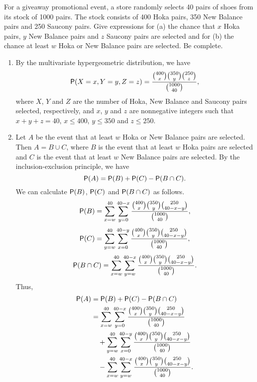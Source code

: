 \documentclass[12pt]{article}
\newcommand{\Prob}{{\sf P}}
\newenvironment{problem}[2][Problem]{\begin{trivlist}
\item[\hskip \labelsep {\bfseries #1}\hskip \labelsep {\bfseries #2.}]}
{\end{trivlist}}
\begin{document}
\begin{problem}{4}
  For a giveaway promotional event, a store randomly selects 40 
  pairs of shoes from its stock of 1000 pairs. The stock consists of 
  400 Hoka pairs, 350 New Balance pairs and 250 Saucony pairs. 
  Give expressions for (a) the chance that $x$ Hoka pairs, 
  $y$ New Balance pairs and $z$ Saucony pairs are selected and for 
  (b) the chance at least $w$ Hoka or New Balance pairs
  are selected. Be complete.

  \begin{enumerate}
    \item By the multivariate hypergeometric distribution, we have
    \[
      \Prob(X = x, Y = y, Z = z) = \frac{\binom{400}{x} \binom{350}{y} \binom{250}{z}}
      {\binom{1000}{40}},
    \]
    where $X$, $Y$ and $Z$ are the number of Hoka, New Balance and Saucony pairs
    selected, respectively, and $x$, $y$ and $z$ are nonnegative integers such that
    $x + y + z = 40$, $x \le 400$, $y \le 350$ and $z \le 250$.
    \item Let $A$ be the event that at least $w$ Hoka or New Balance pairs
    are selected. Then $A = B \cup C$, where $B$ is the event that at least $w$ Hoka pairs
    are selected and $C$ is the event that at least $w$ New Balance pairs are selected.
    By the inclusion-exclusion principle, we have
    \[
      \Prob(A) = \Prob(B) + \Prob(C) - \Prob(B \cap C).
    \]
    We can calculate $\Prob(B)$, $\Prob(C)$ and $\Prob(B \cap C)$ as follows.
    \[
      \Prob(B) = \sum_{x=w}^{40} \sum_{y=0}^{40-x} 
      \frac{\binom{400}{x} \binom{350}{y} \binom{250}{40-x-y}}{\binom{1000}{40}},
    \]
    \[
      \Prob(C) = \sum_{y=w}^{40} \sum_{x=0}^{40-y} 
      \frac{\binom{400}{x} \binom{350}{y} \binom{250}{40-x-y}}{\binom{1000}{40}},
    \]
    \[
      \Prob(B \cap C) = \sum_{x=w}^{40} \sum_{y=w}^{40-x} 
      \frac{\binom{400}{x} \binom{350}{y} \binom{250}{40-x-y}}{\binom{1000}{40}}.
    \]
    Thus,
    \[
      \begin{aligned}
        \Prob(A) &= \Prob(B) + \Prob(C) - \Prob(B \cap C) \\
        &= \sum_{x=w}^{40} \sum_{y=0}^{40-x} 
        \frac{\binom{400}{x} \binom{350}{y} \binom{250}{40-x-y}}{\binom{1000}{40}} \\
        &\quad + \sum_{y=w}^{40} \sum_{x=0}^{40-y} 
        \frac{\binom{400}{x} \binom{350}{y} \binom{250}{40-x-y}}{\binom{1000}{40}} \\
        &\quad - \sum_{x=w}^{40} \sum_{y=w}^{40-x} 
        \frac{\binom{400}{x} \binom{350}{y} \binom{250}{40-x-y}}{\binom{1000}{40}}.
      \end{aligned}
    \]
  \end{enumerate}
\end{problem}

\end{document}
